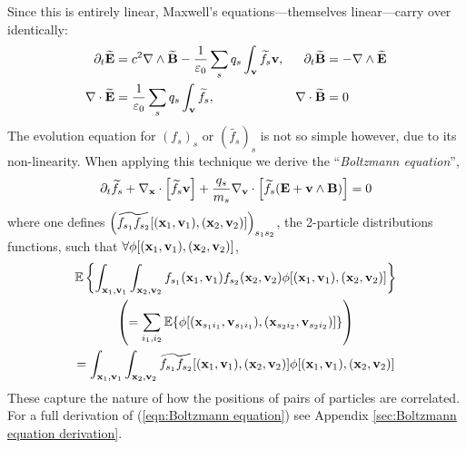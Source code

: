    Since this is entirely linear, Maxwell's equations—themselves linear—carry over identically:
    \begin{align*}
        \partial_{t}\widetilde{\mathbf{E}}  &=  c^{2}\nabla\wedge\widetilde{\mathbf{B}} - \frac{1}{\varepsilon_{0}}\sum_{s}q_{s}\int_{\mathbf{v}}\widetilde{f_{s}}\mathbf{v},  &
        \partial_{t}\widetilde{\mathbf{B}}  &=  - \nabla\wedge\widetilde{\mathbf{E}}  \\
        \nabla\cdot\widetilde{\mathbf{E}}  &=  \frac{1}{\varepsilon_{0}}\sum_{s}q_{s}\int_{\mathbf{v}}\widetilde{f_{s}},  &
        \nabla\cdot\widetilde{\mathbf{B}}  &=  0
    \end{align*}
    The evolution equation for $(f_{s})_{s}$ or $\left(\widetilde{f_{s}}\right)_{s}$ is not so simple however, due to its non-linearity. When applying this technique we derive the ``\emph{Boltzmann equation}'',
    \begin{equation}\label{eqn:Boltzmann equation}
        \partial_{t}\widetilde{f_{s}} + \nabla_{\mathbf{x}}\cdot\left[\widetilde{f_{s}}\mathbf{v}\right] + \frac{q_{s}}{m_{s}}\nabla_{\mathbf{v}}\cdot\left[\widetilde{f_{s}}(\mathbf{E} + \mathbf{v}\wedge\mathbf{B})\right]  =  0
    \end{equation}
    where one defines $\left(\widetilde{f_{s_{1}}f_{s_{2}}}[(\mathbf{x}_{1}, \mathbf{v}_{1}), (\mathbf{x}_{2}, \mathbf{v}_{2})]\right)_{s_{1}s_{2}}$, the 2-particle distributions functions, such that $\forall \phi[(\mathbf{x}_{1}, \mathbf{v}_{1}), (\mathbf{x}_{2}, \mathbf{v}_{2})]$,
    \begin{multline}
        \mathbb{E}\left\{\int_{\mathbf{x}_{1}, \mathbf{v}_{1}}\int_{\mathbf{x}_{2}, \mathbf{v}_{2}}f_{s_{1}}(\mathbf{x}_{1}, \mathbf{v}_{1})f_{s_{2}}(\mathbf{x}_{2}, \mathbf{v}_{2})\phi[(\mathbf{x}_{1}, \mathbf{v}_{1}), (\mathbf{x}_{2}, \mathbf{v}_{2})]\right\}  \\
        \left(=  \sum_{i_{1}, i_{2}}\mathbb{E}\{\phi[(\mathbf{x}_{s_{1}i_{1}}, \mathbf{v}_{s_{1}i_{1}}), (\mathbf{x}_{s_{2}i_{2}}, \mathbf{v}_{s_{2}i_{2}})]\}\right)  \\
        =  \int_{\mathbf{x}_{1}, \mathbf{v}_{1}}\int_{\mathbf{x}_{2}, \mathbf{v}_{2}}\widetilde{f_{s_{1}}f_{s_{2}}}[(\mathbf{x}_{1}, \mathbf{v}_{1}), (\mathbf{x}_{2}, \mathbf{v}_{2})]\phi[(\mathbf{x}_{1}, \mathbf{v}_{1}), (\mathbf{x}_{2}, \mathbf{v}_{2})]
    \end{multline}
    These capture the nature of how the positions of pairs of particles are correlated. For a full derivation of (\ref{eqn:Boltzmann equation}) see Appendix \ref{sec:Boltzmann equation derivation}.

    
